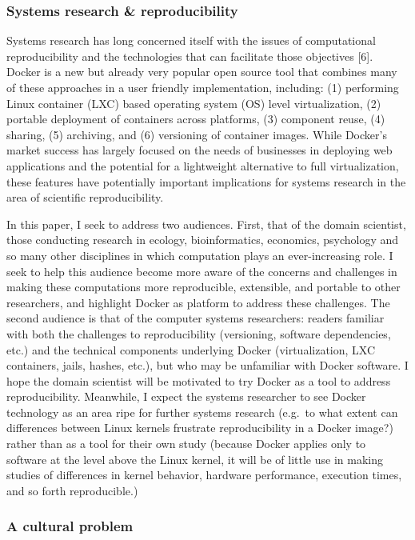 \documentclass[9pt]{components/acm_proc_article-sp}
\begin{document}
\subsubsection{Systems research \&
reproducibility}\label{systems-research-reproducibility}

Systems research has long concerned itself with the issues of
computational reproducibility and the technologies that can facilitate
those objectives {[}6{]}. Docker is a new but already very popular open
source tool that combines many of these approaches in a user friendly
implementation, including: (1) performing Linux container (LXC) based
operating system (OS) level virtualization, (2) portable deployment of
containers across platforms, (3) component reuse, (4) sharing, (5)
archiving, and (6) versioning of container images. While Docker's market
success has largely focused on the needs of businesses in deploying web
applications and the potential for a lightweight alternative to full
virtualization, these features have potentially important implications
for systems research in the area of scientific reproducibility.

In this paper, I seek to address two audiences. First, that of the
domain scientist, those conducting research in ecology, bioinformatics,
economics, psychology and so many other disciplines in which computation
plays an ever-increasing role. I seek to help this audience become more
aware of the concerns and challenges in making these computations more
reproducible, extensible, and portable to other researchers, and
highlight Docker as platform to address these challenges. The second
audience is that of the computer systems researchers: readers familiar
with both the challenges to reproducibility (versioning, software
dependencies, etc.) and the technical components underlying Docker
(virtualization, LXC containers, jails, hashes, etc.), but who may be
unfamiliar with Docker software. I hope the domain scientist will be
motivated to try Docker as a tool to address reproducibility. Meanwhile,
I expect the systems researcher to see Docker technology as an area ripe
for further systems research (e.g.~to what extent can differences
between Linux kernels frustrate reproducibility in a Docker image?)
rather than as a tool for their own study (because Docker applies only
to software at the level above the Linux kernel, it will be of little
use in making studies of differences in kernel behavior, hardware
performance, execution times, and so forth reproducible.)

\subsubsection{A cultural problem}\label{a-cultural-problem}
\end{document}
